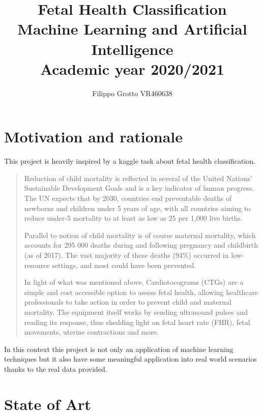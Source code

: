 \documentclass[a4paper,12pt]{article}
\begin{document}
\author{Filippo Grotto VR460638}

\title{Fetal Health Classification  \\[1ex] \large Machine Learning and Artificial Intelligence \\[1ex] \large Academic year 2020/2021}

\maketitle
\newpage
\tableofcontents
\newpage

\section{Motivation and rationale}
This project is heavily inspired by a kaggle task \cite{kaggle} about fetal health classification.
\begin{quote}
Reduction of child mortality is reflected in several of the United Nations' Sustainable Development Goals and is a key indicator of human progress.
The UN expects that by 2030, countries end preventable deaths of newborns and children under 5 years of age, with all countries aiming to reduce under‑5 mortality to at least as low as 25 per 1,000 live births.

Parallel to notion of child mortality is of course maternal mortality, which accounts for 295 000 deaths during and following pregnancy and childbirth (as of 2017). The vast majority of these deaths (94\%) occurred in low-resource settings, and most could have been prevented.

In light of what was mentioned above, Cardiotocograms (CTGs) are a simple and cost accessible option to assess fetal health, allowing healthcare professionals to take action in order to prevent child and maternal mortality. The equipment itself works by sending ultrasound pulses and reading its response, thus shedding light on fetal heart rate (FHR), fetal movements, uterine contractions and more.
\end{quote}
In this context this project is not only an application of machine learning techniques but it also have some meaningful application into real world scenarios thanks to the real data provided.

\section{State of Art}
\end{document}
